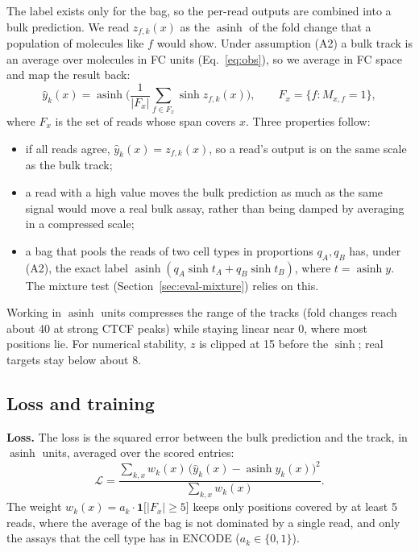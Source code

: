 \documentclass[acmtog,nonacm]{acmart}   %
\begin{document}
The label exists only for the bag, so the per-read outputs are combined into a bulk prediction. We read
$z_{f,k}(x)$ as the $\operatorname{asinh}$ of the fold change that a population of molecules like $f$ would show.
Under assumption (A2) a bulk track is an average over molecules in FC units (Eq.~\ref{eq:obs}), so we average in FC
space and map the result back:
\begin{equation}
\hat y_k(x)=\operatorname{asinh}\Big(\frac{1}{|F_x|}\sum_{f\in F_x}\sinh z_{f,k}(x)\Big),
\qquad F_x=\{f: M_{x,f}=1\},
\label{eq:agg}
\end{equation}
where $F_x$ is the set of reads whose span covers $x$. Three properties follow:
\begin{itemize}
  \item if all reads agree, $\hat y_k(x)=z_{f,k}(x)$, so a read's output is on the same scale as the bulk track;
  \item a read with a high value moves the bulk prediction as much as the same signal would move a real bulk
    assay, rather than being damped by averaging in a compressed scale;
  \item a bag that pools the reads of two cell types in proportions $q_A,q_B$ has, under (A2), the exact label
    $\operatorname{asinh}(q_A\sinh t_A+q_B\sinh t_B)$, where $t=\operatorname{asinh}y$. The mixture test
    (Section~\ref{sec:eval-mixture}) relies on this.
\end{itemize}
Working in $\operatorname{asinh}$ units compresses the range of the tracks (fold changes reach about 40 at strong
CTCF peaks) while staying linear near 0, where most positions lie. For numerical stability, $z$ is clipped at 15
before the $\sinh$; real targets stay below about 8.

\subsection{Loss and training}
\label{sec:training}

\textbf{Loss.} The loss is the squared error between the bulk prediction and the track, in $\operatorname{asinh}$
units, averaged over the scored entries:
\begin{equation}
\mathcal{L}=\frac{\sum_{k,x} w_{k}(x)\,\big(\hat y_k(x)-\operatorname{asinh}y_k(x)\big)^2}{\sum_{k,x} w_k(x)}.
\label{eq:loss}
\end{equation}
The weight $w_k(x)=a_k\cdot\mathbf{1}\big[|F_x|\ge5\big]$ keeps only positions covered by at least 5 reads, where
the average of the bag is not dominated by a single read, and only the assays that the cell type has in ENCODE
($a_k\in\{0,1\}$).
\end{document}
